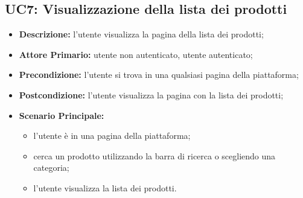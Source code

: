 \subsection{UC7: Visualizzazione della lista dei prodotti}
\label{sec:UC7}
\begin{itemize}
    \item \textbf{Descrizione:} l'utente visualizza la pagina della lista dei prodotti;
    \item \textbf{Attore Primario:} utente non autenticato, utente autenticato;
    \item \textbf{Precondizione:} l'utente si trova in una qualsiasi pagina della piattaforma;
    \item \textbf{Postcondizione:} l'utente visualizza la pagina con la lista dei prodotti;
    \item \textbf{Scenario Principale:}
          \begin{itemize}
              \item l'utente è in una pagina della piattaforma;
              \item cerca un prodotto utilizzando la barra di ricerca o scegliendo una categoria;
              \item l'utente visualizza la lista dei prodotti.
          \end{itemize}
\end{itemize}
